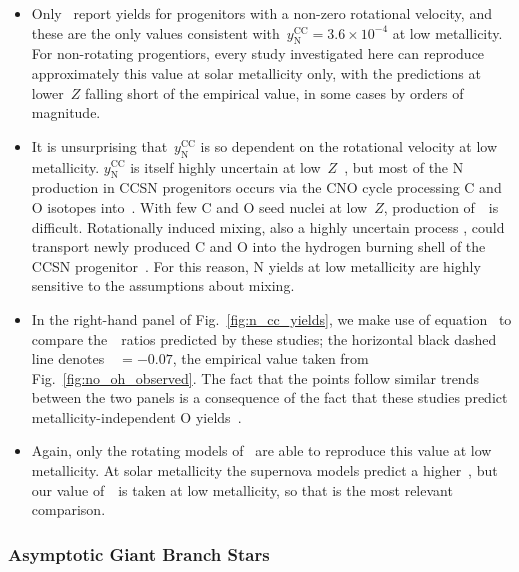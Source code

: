 \documentclass[ms.tex]{subfiles}
\begin{document}
\begin{itemize}
	\item Only~\citet{Limongi2018} report yields for progenitors with a 
	non-zero rotational velocity, and these are the only values consistent 
	with~$y_\text{N}^\text{CC} = 3.6\times10^{-4}$ at low metallicity. 
	For non-rotating progentiors, every study investigated here can reproduce 
	approximately this value at solar metallicity only, with the predictions at 
	lower~$Z$ falling short of the empirical value, in some cases by orders of 
	magnitude. 

	\item It is unsurprising that~$y_\text{N}^\text{CC}$ is so dependent on the 
	rotational velocity at low metallicity. 
	$y_\text{N}^\text{CC}$ is itself highly uncertain at 
	low~$Z$~\citep{Heger2010}, but most of the N production in CCSN progenitors 
	occurs via the CNO cycle processing C and O isotopes into~\Nfourteen. 
	With few C and O seed nuclei at low~$Z$, production of~\Nfourteen~is 
	difficult. 
	Rotationally induced mixing, also a highly uncertain process 
	\citep{Frischknecht2016}, could transport newly produced C and O into the 
	hydrogen burning shell of the CCSN progenitor~\citep[see discussion 
	in~\S~4.2 of][]{Andrews2017}. For this reason, N yields at low metallicity 
	are highly sensitive to the assumptions about mixing. 

	\item In the right-hand panel of Fig.~\ref{fig:n_cc_yields}, we make use of 
	equation~ to compare the~\no~ratios predicted by these 
	studies; the horizontal black dashed line denotes~\no\subcc~$= -0.07$, the 
	empirical value taken from Fig.~\ref{fig:no_oh_observed}. 
	The fact that the points follow similar trends between the two panels is a 
	consequence of the fact that these studies predict metallicity-independent 
	O yields~\citep{Griffith2021}. 

	\item Again, only the rotating models of~\citet{Limongi2018} are able to 
	reproduce this value at low metallicity. 
	At solar metallicity the supernova models predict a higher~\no\subcc, but 
	our value of~\no\subcc~is taken at low metallicity, so that is the 
	most relevant comparison. 
\end{itemize} 

\subsubsection{Asymptotic Giant Branch Stars} 
\label{sec:methods:yields:agb} 
\end{document}
